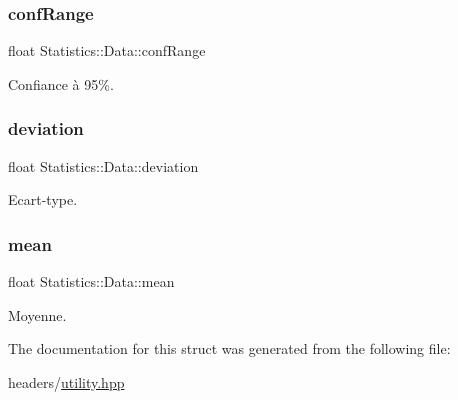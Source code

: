 \subsubsection{\texorpdfstring{conf\+Range}{confRange}}
{\footnotesize\ttfamily float Statistics\+::\+Data\+::conf\+Range}



Confiance à 95\%. 

\mbox{\label{structStatistics_1_1Data_a4ab98072b8f7055a828ea80077a059f0}} 
\subsubsection{\texorpdfstring{deviation}{deviation}}
{\footnotesize\ttfamily float Statistics\+::\+Data\+::deviation}



Ecart-\/type. 

\mbox{\label{structStatistics_1_1Data_a70c674f35bce1803c894c1df2649ac3f}} 
\subsubsection{\texorpdfstring{mean}{mean}}
{\footnotesize\ttfamily float Statistics\+::\+Data\+::mean}



Moyenne. 



The documentation for this struct was generated from the following file\+:\begin{DoxyCompactItemize}
\item 
headers/\hyperlink{utility_8hpp}{utility.\+hpp}\end{DoxyCompactItemize}

